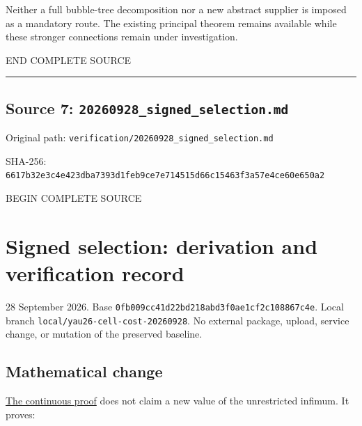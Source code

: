 \documentclass[
  10pt,
]{article}
\begin{document}
Neither a full bubble-tree decomposition nor a new abstract supplier is
imposed as a mandatory route. The existing principal theorem remains
available while these stronger connections remain under investigation.

END COMPLETE SOURCE

\begin{center}\rule{0.5\linewidth}{0.5pt}\end{center}

\hypertarget{source-7-20260928_signed_selection.md}{%
\subsection{Source 7:
\nolinkurl{20260928_signed_selection.md}}\label{source-7-20260928_signed_selection.md}}

Original path: \nolinkurl{verification/20260928_signed_selection.md}

SHA-256:
\nolinkurl{6617b32e3c4e423dba7393d1feb9ce7e714515d66c15463f3a57e4ce60e650a2}

BEGIN COMPLETE SOURCE

\hypertarget{signed-selection-derivation-and-verification-record}{%
\section{Signed selection: derivation and verification
record}\label{signed-selection-derivation-and-verification-record}}

28 September 2026. Base
\nolinkurl{0fb009cc41d22bd218abd3f0ae1cf2c108867c4e}. Local branch
\nolinkurl{local/yau26-cell-cost-20260928}. No external package, upload,
service change, or mutation of the preserved baseline.

\hypertarget{mathematical-change}{%
\subsection{Mathematical change}\label{mathematical-change}}

\href{../continuation/20260928_signed_characteristic_selection.md}{The
continuous proof} does not claim a new value of the unrestricted
infimum. It proves:
\end{document}
